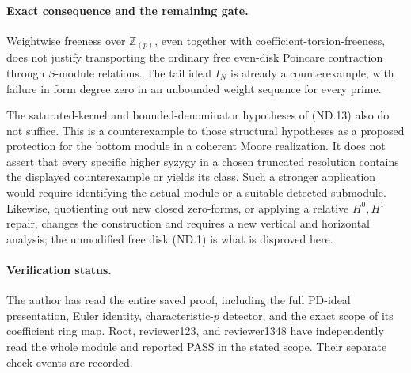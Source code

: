 \paragraph{Exact consequence and the remaining gate.}
Weightwise freeness over \(\mathbb Z_{(p)}\), even together
with coefficient-torsion-freeness, does not justify transporting
the ordinary free even-disk Poincare contraction through
\(S\)-module relations. The tail ideal \(I_N\) is already a
counterexample, with failure in form degree zero in an unbounded
weight sequence for every prime.

The saturated-kernel and bounded-denominator hypotheses of
(ND.13) also do not suffice. This is a counterexample to those
structural hypotheses as a proposed protection for the bottom
module in a coherent Moore realization. It does not assert that
every specific higher syzygy in a chosen truncated resolution
contains the displayed counterexample or yields its class.
Such a stronger application would require identifying the
actual module or a suitable detected submodule.
Likewise, quotienting out new closed zero-forms, or applying a
relative \(H^0,H^1\) repair, changes the construction and requires
a new vertical and horizontal analysis; the unmodified free
disk (ND.1) is what is disproved here.

\paragraph{Verification status.}
The author has read the entire saved proof, including the
full PD-ideal presentation, Euler identity, characteristic-\(p\)
detector, and the exact scope of its coefficient ring map.
Root, reviewer123, and reviewer1348 have independently read the
whole module and reported PASS in the stated scope. Their separate
check events are recorded.
